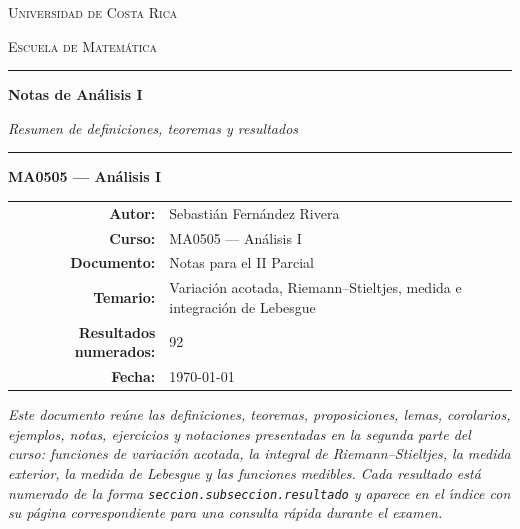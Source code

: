 \documentclass[11pt,twoside]{article}
\newcounter{result}[subsection]
\begin{document}
\begin{titlepage}
\thispagestyle{empty}
\centering

\vspace*{1.5cm}

{\scshape\Large Universidad de Costa Rica\par}
\vspace{0.3cm}
{\scshape\large Escuela de Matem\'atica\par}

\vspace{1.2cm}

{\color{blue!50!black}\rule{\textwidth}{1.2pt}}
\vspace{0.6cm}

{\Huge\bfseries Notas de An\'alisis I\par}

\vspace{0.5cm}

{\Large\itshape Resumen de definiciones, teoremas y resultados\par}

\vspace{0.4cm}
{\color{blue!50!black}\rule{\textwidth}{1.2pt}}

\vspace{1.4cm}

{\Large\bfseries MA0505 --- An\'alisis I\par}

\vspace{2.2cm}

\begin{tabular}{rl}
\textbf{Autor:}              & Sebasti\'{a}n Fern\'{a}ndez Rivera \\[4pt]
\textbf{Curso:}              & MA0505 --- An\'alisis I \\[4pt]
\textbf{Documento:}          & Notas para el II Parcial \\[4pt]
\textbf{Temario:}            & Variaci\'on acotada, Riemann--Stieltjes, medida e integraci\'on de Lebesgue \\[4pt]
\textbf{Resultados numerados:} & 92 \\[4pt]
\textbf{Fecha:}              & \today
\end{tabular}

\vfill

\begin{minipage}{0.85\textwidth}
\centering
\itshape
Este documento re\'{u}ne las definiciones, teoremas, proposiciones, lemas, corolarios, ejemplos, notas, ejercicios y notaciones presentadas en la segunda parte del curso: funciones de variaci\'on acotada, la integral de Riemann--Stieltjes, la medida exterior, la medida de Lebesgue y las funciones medibles. Cada resultado est\'a numerado de la forma \texttt{seccion.subseccion.resultado} y aparece en el \'{\i}ndice con su p\'{a}gina correspondiente para una consulta r\'{a}pida durante el examen.
\end{minipage}


\end{titlepage}
\end{document}
